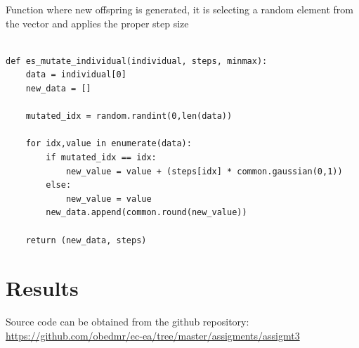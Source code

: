 \documentclass[]{spie}  %
\begin{document}
Function where new offspring is generated, it is selecting a random element from the vector and applies the proper step size
\begin{lstlisting}[frame=single]  % Start your code-block 

def es_mutate_individual(individual, steps, minmax):
    data = individual[0]
    new_data = []

    mutated_idx = random.randint(0,len(data))

    for idx,value in enumerate(data):
        if mutated_idx == idx:
            new_value = value + (steps[idx] * common.gaussian(0,1))
        else:
            new_value = value
        new_data.append(common.round(new_value))

    return (new_data, steps)

\end{lstlisting}

\section{Results}
Source code can be obtained from the github repository:
\url{https://github.com/obedmr/ec-ea/tree/master/assigments/assigmt3}
\end{document}
